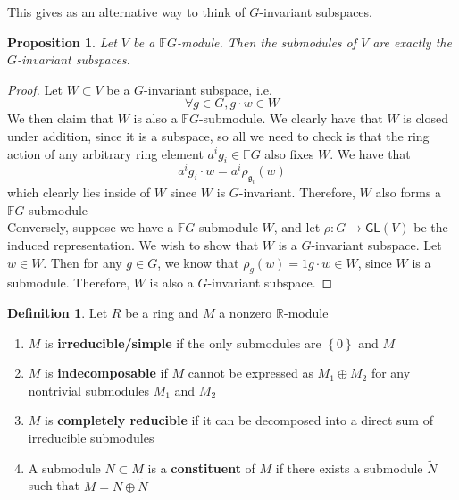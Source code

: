 \documentclass[psamsfonts]{amsart}
\newtheorem{prop}[thm]{Proposition}
\theoremstyle{definition}
\newtheorem{defn}[thm]{Definition}
\theoremstyle{remark}
\newcommand{\R}{\mathbb{R}}
\newcommand{\F}{\mathbb{F}}
\newcommand{\GL}{\mathsf{GL}}
\newcommand{\g}{\mathfrak{g}}
\newcommand{\set}[1]{\left\lbrace#1 \right\rbrace}
\begin{document}
This gives as an alternative way to think of $G$-invariant subspaces.
\begin{prop}
Let $V$ be a $\F G$-module. Then the submodules of $V$ are exactly the $G$-invariant subspaces.
\end{prop}

\begin{proof}
Let $W \subset V$ be a $G$-invariant subspace, i.e.
$$\forall g \in G, g \cdot w \in W $$
We then claim that $W$ is also a $\F G$-submodule. We clearly have that $W$ is closed under addition, since it is a subspace, so all we need to check is that the ring action of any arbitrary ring element $a^ig_i \in \F G$ also fixes $W$. We have that 
$$a^ig_i \cdot w = a^i \rho_{\g_i}(w) $$
which clearly lies inside of $W$ since $W$ is $G$-invariant. Therefore, $W$ also forms a $\F G$-submodule\\

Conversely, suppose we have a $\F G$ submodule $W$, and let $\rho: G \to \GL(V)$ be the induced representation. We wish to show that $W$ is a $G$-invariant subspace. Let $w \in W$. Then for any $g \in G$, we know that $\rho_g(w) = 1g \cdot w \in W$, since $W$ is a submodule. Therefore, $W$ is also a $G$-invariant subspace.
\end{proof}

\begin{defn}
Let $R$ be a ring and $M$ a nonzero $\R$-module
\begin{enumerate}
\item $M$ is \textbf{irreducible/simple} if the only submodules are $\set{0}$ and $M$
\item $M$ is \textbf{indecomposable} if $M$ cannot be expressed as $M_1 \oplus M_2$ for any nontrivial submodules $M_1$ and $M_2$
\item $M$ is \textbf{completely reducible} if it can be decomposed into a direct sum of irreducible submodules
\item A submodule $N \subset M$ is a \textbf{constituent} of $M$ if there exists a submodule $\tilde{N}$ such that $M = N \oplus \tilde{N}$
\end{enumerate}
\end{defn}
\end{document}
